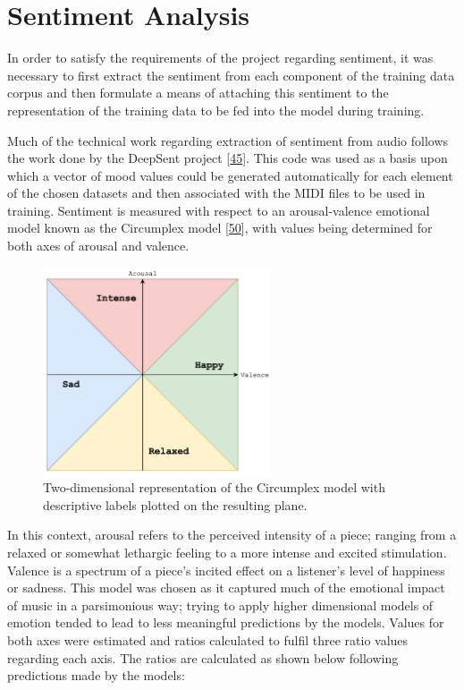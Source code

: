 \documentclass[12pt,]{article}
\begin{document}
\hypertarget{sentiment-analysis}{%
\section{Sentiment Analysis}\label{sentiment-analysis}}

In order to satisfy the requirements of the project regarding sentiment,
it was necessary to first extract the sentiment from each component of
the training data corpus and then formulate a means of attaching this
sentiment to the representation of the training data to be fed into the
model during training.

Much of the technical work regarding extraction of sentiment from audio
follows the work done by the DeepSent project
{[}\protect\hyperlink{ref-deepsent}{45}{]}. This code was used as a
basis upon which a vector of mood values could be generated
automatically for each element of the chosen datasets and then
associated with the MIDI files to be used in training. Sentiment is
measured with respect to an arousal-valence emotional model known as the
Circumplex model
{[}\protect\hyperlink{ref-russell1980circumplex}{50}{]}, with values
being determined for both axes of arousal and valence.

\begin{figure}
\centering
\includegraphics[width=0.6\textwidth,height=\textheight]{Images/circumplex.png}
\caption{Two-dimensional representation of the Circumplex model with
descriptive labels plotted on the resulting plane.}
\end{figure}

In this context, arousal refers to the perceived intensity of a piece;
ranging from a relaxed or somewhat lethargic feeling to a more intense
and excited stimulation. Valence is a spectrum of a piece's incited
effect on a listener's level of happiness or sadness. This model was
chosen as it captured much of the emotional impact of music in a
parsimonious way; trying to apply higher dimensional models of emotion
tended to lead to less meaningful predictions by the models. Values for
both axes were estimated and ratios calculated to fulfil three ratio
values regarding each axis. The ratios are calculated as shown below
following predictions made by the models:
\end{document}
